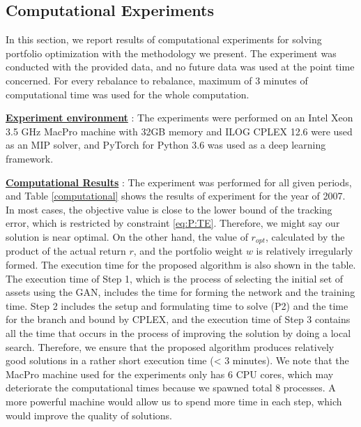 \documentclass[11pt]{article}
\begin{document}
\subsection{Computational Experiments}
In this section, we report results of computational experiments for solving portfolio optimization with the methodology we present. 
The experiment was conducted with the provided data, and no future data was used at the point time concerned. For every rebalance to rebalance, maximum of 3 minutes of computational time was used for the whole computation. 
	
\underline{\textbf{Experiment environment}} : The experiments were performed on an Intel Xeon 3.5 GHz MacPro machine with 32GB memory and ILOG CPLEX 12.6 were used as an MIP solver, and PyTorch for Python 3.6 was used as a deep learning framework. 

\underline{\textbf{Computational Results}} : The experiment was performed for all given periods, and Table \ref{computational} shows the results of experiment for the year of 2007. In most cases, the objective value is close to the lower bound of the tracking error, which is restricted by constraint \eqref{eq:P:TE}. Therefore, we might say our solution is near optimal. On the other hand, the value of $ r_{opt}$, calculated by the product of the actual return $r$, and the portfolio weight $w$ is relatively irregularly formed. The execution time for the proposed algorithm is also shown in the table. The execution time of Step 1, which is the process of selecting the initial set of assets using the GAN, includes the time for forming the network and the training time. Step 2 includes the setup and formulating time to solve (P2) and the time for the branch and bound by CPLEX, and the execution time of Step 3 contains all the time that occurs in the process of improving the solution by doing a local search. Therefore, we ensure that the proposed algorithm produces relatively good solutions in a rather short execution time (< 3 minutes). We note that the MacPro machine used for the experiments only has 6 CPU cores, which may deteriorate the computational times because we spawned total 8 processes. A more powerful machine would allow us to spend more time in each step, which would improve the quality of solutions.
\end{document}
